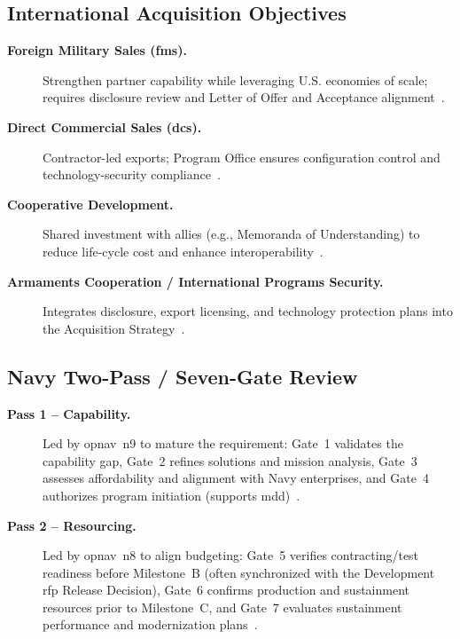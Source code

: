 \documentclass[../main.tex]{subfiles}
\begin{document}
\subsection{International Acquisition Objectives}
\begin{description}
  \item[\textbf{Foreign Military Sales (\ac{fms}).}] Strengthen partner capability while leveraging U.S. economies of scale; requires disclosure review and Letter of Offer and Acceptance alignment~\autocite{DoDI5000-85}.
  \item[\textbf{Direct Commercial Sales (\ac{dcs}).}] Contractor-led exports; Program Office ensures configuration control and technology-security compliance~\autocite{DoDI5000-85}.
  \item[\textbf{Cooperative Development.}] Shared investment with allies (e.g., Memoranda of Understanding) to reduce life-cycle cost and enhance interoperability~\autocite{DoDI5000-85}.
  \item[\textbf{Armaments Cooperation / International Programs Security.}] Integrates disclosure, export licensing, and technology protection plans into the Acquisition Strategy~\autocite{DoDI5000-85}.
\end{description}

\subsection{Navy Two-Pass / Seven-Gate Review}
\begin{description}
  \item[\textbf{Pass 1 -- Capability.}] Led by \ac{opnav}~\ac{n9} to mature the requirement: Gate~1 validates the capability gap, Gate~2 refines solutions and mission analysis, Gate~3 assesses affordability and alignment with Navy enterprises, and Gate~4 authorizes program initiation (supports \ac{mdd})~\autocite{OPNAVINST5000-42E}.
  \item[\textbf{Pass 2 -- Resourcing.}] Led by \ac{opnav}~\ac{n8} to align budgeting: Gate~5 verifies contracting/test readiness before Milestone~B (often synchronized with the Development \ac{rfp} Release Decision), Gate~6 confirms production and sustainment resources prior to Milestone~C, and Gate~7 evaluates sustainment performance and modernization plans~\autocite{OPNAVINST5000-42E}.
\end{description}
\end{document}

